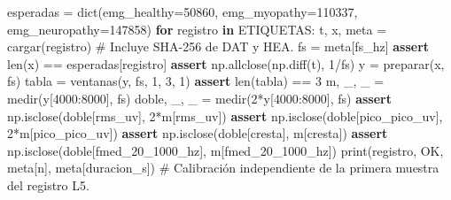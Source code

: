 \documentclass[
  spanish,
  10.5pt,
  a4paper,
  DIV=11,
  numbers=noendperiod]{scrartcl}
\newenvironment{Shaded}{\begin{snugshade}}{\end{snugshade}}
\newcommand{\BuiltInTok}[1]{\textcolor[rgb]{0.00,0.23,0.31}{#1}}
\newcommand{\CommentTok}[1]{\textcolor[rgb]{0.37,0.37,0.37}{#1}}
\newcommand{\ControlFlowTok}[1]{\textcolor[rgb]{0.00,0.23,0.31}{\textbf{#1}}}
\newcommand{\DecValTok}[1]{\textcolor[rgb]{0.68,0.00,0.00}{#1}}
\newcommand{\KeywordTok}[1]{\textcolor[rgb]{0.00,0.23,0.31}{\textbf{#1}}}
\newcommand{\NormalTok}[1]{\textcolor[rgb]{0.00,0.23,0.31}{#1}}
\newcommand{\OperatorTok}[1]{\textcolor[rgb]{0.37,0.37,0.37}{#1}}
\newcommand{\StringTok}[1]{\textcolor[rgb]{0.13,0.47,0.30}{#1}}
\begin{document}
\begin{Shaded}
\begin{Highlighting}[]
\NormalTok{esperadas }\OperatorTok{=} \BuiltInTok{dict}\NormalTok{(emg\_healthy}\OperatorTok{=}\DecValTok{50860}\NormalTok{, emg\_myopathy}\OperatorTok{=}\DecValTok{110337}\NormalTok{,}
\NormalTok{                 emg\_neuropathy}\OperatorTok{=}\DecValTok{147858}\NormalTok{)}
\ControlFlowTok{for}\NormalTok{ registro }\KeywordTok{in}\NormalTok{ ETIQUETAS:}
\NormalTok{    t, x, meta }\OperatorTok{=}\NormalTok{ cargar(registro)  }\CommentTok{\# Incluye SHA{-}256 de DAT y HEA.}
\NormalTok{    fs }\OperatorTok{=}\NormalTok{ meta[}\StringTok{\textquotesingle{}fs\_hz\textquotesingle{}}\NormalTok{]}
    \ControlFlowTok{assert} \BuiltInTok{len}\NormalTok{(x) }\OperatorTok{==}\NormalTok{ esperadas[registro]}
    \ControlFlowTok{assert}\NormalTok{ np.allclose(np.diff(t), }\DecValTok{1}\OperatorTok{/}\NormalTok{fs)}
\NormalTok{    y }\OperatorTok{=}\NormalTok{ preparar(x, fs)}
\NormalTok{    tabla }\OperatorTok{=}\NormalTok{ ventanas(y, fs, }\DecValTok{1}\NormalTok{, }\DecValTok{3}\NormalTok{, }\DecValTok{1}\NormalTok{)}
    \ControlFlowTok{assert} \BuiltInTok{len}\NormalTok{(tabla) }\OperatorTok{==} \DecValTok{3}
\NormalTok{    m, \_, \_ }\OperatorTok{=}\NormalTok{ medir(y[}\DecValTok{4000}\NormalTok{:}\DecValTok{8000}\NormalTok{], fs)}
\NormalTok{    doble, \_, \_ }\OperatorTok{=}\NormalTok{ medir(}\DecValTok{2}\OperatorTok{*}\NormalTok{y[}\DecValTok{4000}\NormalTok{:}\DecValTok{8000}\NormalTok{], fs)}
    \ControlFlowTok{assert}\NormalTok{ np.isclose(doble[}\StringTok{\textquotesingle{}rms\_uv\textquotesingle{}}\NormalTok{], }\DecValTok{2}\OperatorTok{*}\NormalTok{m[}\StringTok{\textquotesingle{}rms\_uv\textquotesingle{}}\NormalTok{])}
    \ControlFlowTok{assert}\NormalTok{ np.isclose(doble[}\StringTok{\textquotesingle{}pico\_pico\_uv\textquotesingle{}}\NormalTok{], }\DecValTok{2}\OperatorTok{*}\NormalTok{m[}\StringTok{\textquotesingle{}pico\_pico\_uv\textquotesingle{}}\NormalTok{])}
    \ControlFlowTok{assert}\NormalTok{ np.isclose(doble[}\StringTok{\textquotesingle{}cresta\textquotesingle{}}\NormalTok{], m[}\StringTok{\textquotesingle{}cresta\textquotesingle{}}\NormalTok{])}
    \ControlFlowTok{assert}\NormalTok{ np.isclose(doble[}\StringTok{\textquotesingle{}fmed\_20\_1000\_hz\textquotesingle{}}\NormalTok{], m[}\StringTok{\textquotesingle{}fmed\_20\_1000\_hz\textquotesingle{}}\NormalTok{])}
    \BuiltInTok{print}\NormalTok{(registro, }\StringTok{\textquotesingle{}OK\textquotesingle{}}\NormalTok{, meta[}\StringTok{\textquotesingle{}n\textquotesingle{}}\NormalTok{], meta[}\StringTok{\textquotesingle{}duracion\_s\textquotesingle{}}\NormalTok{])}
\CommentTok{\# Calibración independiente de la primera muestra del registro L5.}

\end{Highlighting}
\end{Shaded}
\end{document}
